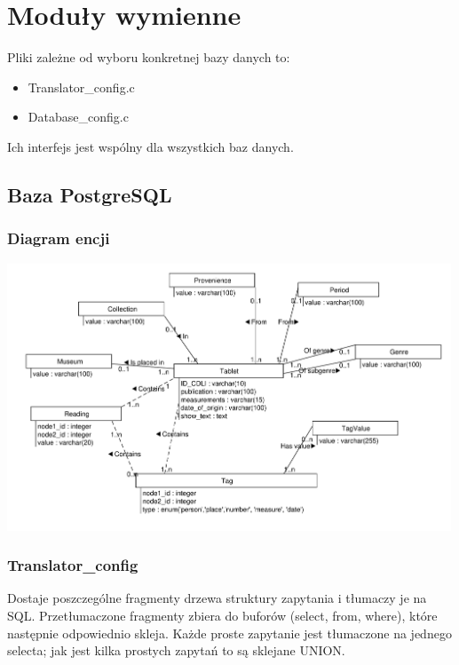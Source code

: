 \documentclass{pracamgr}
\begin{document}
\section{Moduły wymienne}
Pliki zależne od wyboru konkretnej bazy danych to:
\begin{itemize}
 \item Translator\_config.c
\item Database\_config.c
\end{itemize}
Ich interfejs jest wspólny dla wszystkich baz danych.

\subsection{Baza PostgreSQL}
\subsubsection{Diagram encji}
\includegraphics[width=500px]{diagramy/diagram-encji-maly.pdf}
\subsubsection{Translator\_config}
Dostaje poszczególne fragmenty drzewa struktury zapytania i tłumaczy je na SQL. Przetłumaczone fragmenty zbiera do buforów (select, from, where), które następnie odpowiednio skleja.
Każde proste zapytanie jest tłumaczone na jednego selecta; jak jest kilka prostych zapytań to są sklejane UNION.
\end{document}
